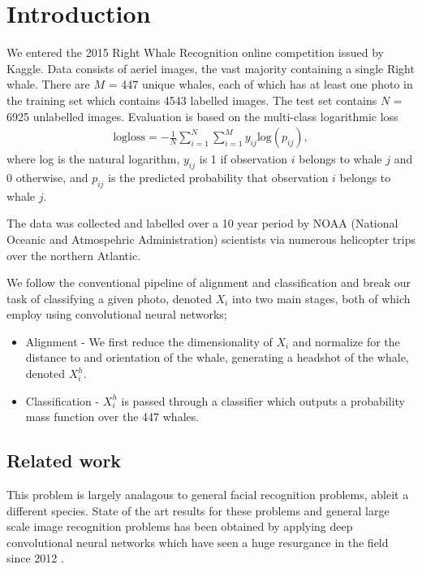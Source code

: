 \documentclass{IET}%
\begin{document}
\section{Introduction}
We entered the 2015 Right Whale Recognition online competition issued by Kaggle. Data consists of aeriel images, the vast majority containing a single Right whale. There are $M$ = 447 unique whales, each of which has at least one photo in the training set which contains 4543 labelled images. The test set contains $N$ = 6925 unlabelled images. Evaluation is based on the multi-class logarithmic loss
\begin{eqnarray}
\text{logloss} = - \frac{1}{N} \sum_{i=1}^{N} \sum_{i=1}^{M} y_{ij} \text{log}(p_{ij}),
\end{eqnarray}
where log is the natural logarithm, $y_{ij}$ is 1 if observation $i$ belongs to whale $j$ and 0 otherwise, and $p_{ij}$ is the predicted probability that observation $i$ belongs to whale $j$. 

The data was collected and labelled over a 10 year period by NOAA (National Oceanic and Atmospehric Administration) scientists via numerous helicopter trips over the northern Atlantic. 

We follow the conventional pipeline of alignment and classification and break our task of classifying a given photo, denoted $X_i$ into two main stages, both of which employ using convolutional neural networks;
\begin{itemize}
\item Alignment - We first reduce the dimensionality of $X_i$ and normalize for the distance to and orientation of the whale, generating a headshot of the whale, denoted $X_i^h$.
\item Classification - $X_i^h$ is passed through a classifier which outputs a probability mass function over the 447 whales.
\end{itemize}

\subsection{Related work}
This problem is largely analagous to general facial recognition problems, ableit a different species. State of the art results for these problems and general large scale image recognition problems has been obtained by applying deep convolutional neural networks which have seen a huge resurgance in the field since 2012 \cite{simonyan2014very,russakovsky2015imagenet,graham2014fractional,mishkin2015all}.
\end{document}
